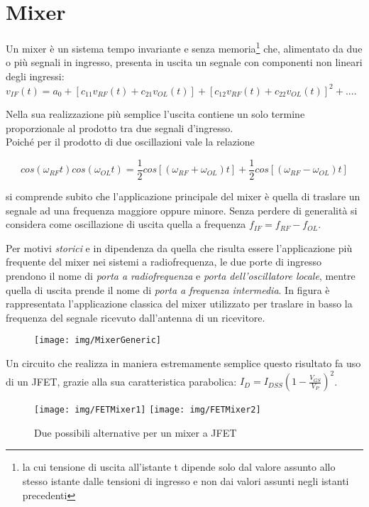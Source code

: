 \chapter{Mixer}
Un mixer è un sistema tempo invariante e senza memoria\footnote{la cui tensione di uscita all'istante t dipende solo dal valore assunto allo stesso istante dalle tensioni di ingresso e non dai valori assunti negli istanti precedenti} che, alimentato da due o più segnali in ingresso, presenta in uscita un segnale con componenti non lineari degli ingressi:\\
$v_{IF}(t) = a_0 + [c_{11}v_{RF}(t) + c_{21}v_{OL}(t)] + [c_{12}v_{RF}(t) + c_{22}v_{OL}(t)]^2 + ...$.

Nella sua realizzazione più semplice l'uscita contiene un solo termine proporzionale al prodotto tra due segnali d'ingresso.\\
Poiché per il prodotto di due oscillazioni vale la relazione

$$cos(\omega_{RF} t) cos(\omega_{OL} t) = \frac{1}{2} cos[(\omega_{RF} + \omega_{OL}) t] + \frac{1}{2} cos[(\omega_{RF} - \omega_{OL}) t]$$

si comprende subito che l'applicazione principale del mixer è quella di traslare un segnale ad una frequenza maggiore oppure minore. Senza perdere di generalità si considera come oscillazione di uscita quella a frequenza $f_{IF} = f_{RF} - f_{OL}$.

Per motivi \textit{storici} e in dipendenza da quella che risulta essere l'applicazione più frequente del mixer nei sistemi a radiofrequenza, le due porte di ingresso
prendono il nome di \textit{porta a radiofrequenza} e \textit{porta dell'oscillatore locale}, mentre quella di
uscita prende il nome di \textit{porta a frequenza intermedia}. In figura è rappresentata l'applicazione
classica del mixer utilizzato per traslare in basso la frequenza del segnale ricevuto dall'antenna di
un ricevitore.
\begin{figure}[h!]
	\centering
	\texttt{[image: img/MixerGeneric]}
	\caption{}
	\label{fig:mixer-001}
\end{figure}


Un circuito che realizza in maniera estremamente semplice questo risultato fa uso di un JFET, grazie alla sua
caratteristica parabolica: $I_D = I_{DSS} ( 1- \frac{V_{GS}}{V_P}  ) ^ 2$.

\begin{figure}[h!]
	\hspace{\fill}
	\texttt{[image: img/FETMixer1]}
	\hspace{\fill}
	\texttt{[image: img/FETMixer2]}
	\hspace{\fill}
	\caption{Due possibili alternative per un mixer a JFET}
\end{figure}


